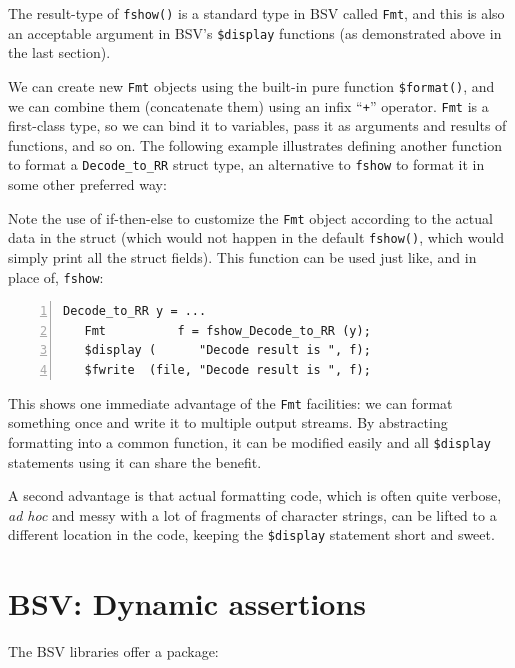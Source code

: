 The result-type of \verb|fshow()| is a standard type in BSV called
\verb|Fmt|, and this is also an acceptable argument in BSV's
\verb|$display| functions (as demonstrated above in the last section).

We can create new \verb|Fmt| objects using the built-in pure function
\verb|$format()|, and we can combine them (concatenate them) using an
infix ``\verb|+|'' operator.  \verb|Fmt| is a first-class type, so we
can bind it to variables, pass it as arguments and results of
functions, and so on.  The following example illustrates defining
another function to format a \verb|Decode_to_RR| struct type, an
alternative to \verb|fshow| to format it in some other preferred way:



Note the use of if-then-else to customize the \verb|Fmt| object
according to the actual data in the struct (which would not happen in
the default \verb|fshow()|, which would simply print all the struct
fields).  This function can be used just like, and in place of,
\verb|fshow|:

{\small
\begin{Verbatim}[frame=single, numbers=left]
   Decode_to_RR y = ...
   Fmt          f = fshow_Decode_to_RR (y);
   $display (      "Decode result is ", f);
   $fwrite  (file, "Decode result is ", f);
\end{Verbatim}
}

This shows one immediate advantage of the \verb|Fmt| facilities: we
can format something once and write it to multiple output streams.  By
abstracting formatting into a common function, it can be modified
easily and all \verb|$display| statements using it can share the
benefit.

A second advantage is that actual formatting code, which is often
quite verbose, \emph{ad hoc} and messy with a lot of fragments of
character strings, can be lifted to a different location in the code,
keeping the \verb|$display| statement short and sweet.


\section{BSV: Dynamic assertions}


The BSV libraries offer a package:

